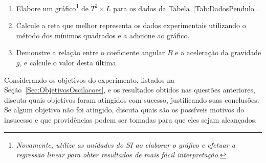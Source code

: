\begin{question}[type={exam}]
\begin{enumerate}[label=\roman*.]
\item Elabore um gráfico\footnote{\emph{Novamente, utilize as unidades do SI ao elaborar o gráfico e efetuar a regressão linear para obter resultados de mais fácil interpretação.}} de $T^2 \times L$ para os dados da Tabela~\ref{Tab:DadosPendulo}.
\item Calcule a reta que melhor representa os dados experimentais utilizando o método dos mínimos quadrados e a adicione ao gráfico.
\item Demonstre a relação entre o coeficiente angular $B$ e a aceleração da gravidade $g$, e calcule o valor desta última.
\end{enumerate}
\end{question}

\begin{question}[type={exam}]
Considerando os objetivos do experimento, listados na Seção~\ref{Sec:ObjetivosOscilacoes}, e os resultados obtidos nas questões anteriores, discuta quais objetivos foram atingidos com sucesso, justificando suas conclusões. Se algum objetivo não foi atingido, discuta quais são os possíveis motivos do insucesso e que providências podem ser tomadas para que eles sejam alcançados.
\end{question}

\vfill
\pagebreak
